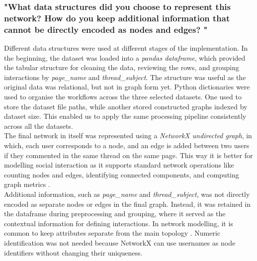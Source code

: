 \documentclass[acmsmall,nonacm,natbib=false]{acmart}
\begin{document}
\subsubsection{\large{\textbf{"What data structures did you choose to represent this network? How do you keep additional information that cannot be directly encoded as nodes and edges? "}}}
\leavevmode \par \noindent
Different data structures were used at different stages of the implementation. In the beginning, the dataset was loaded into a \textit{pandas dataframe}, which provided the tabular structure for cleaning the data, reviewing the rows, and grouping interactions by \textit{page\_name} and \textit{thread\_subject}. The structure was useful as the original data was relational, but not in graph form yet. Python dictionaries were used to organise the workflows across the three selected datasets. One used to store the dataset file paths, while another stored constructed graphs indexed by dataset size. This enabled us to apply the same processing pipeline consistently across all the datasets.\\
The final network in itself was represented using a \textit{NetworkX undirected graph}, in which, each user corresponds to a node, and an edge is added between two users if they commented in the same thread on the same page. This way it is better for modelling social interaction as it supports standard network operations like counting nodes and edges, identifying connected components, and computing graph metrics  \cite{hagberg2008exploring, newman2010networks}.\\
Additional information, such as \textit{page\_name} and \textit{thread\_subject}, was not directly encoded as separate nodes or edges in the final graph. Instead, it was retained in the dataframe during preprocessing and grouping, where it served as the contextual information for defining interactions.
In network modelling, it is common to keep attributes separate from the main topology \cite{newman2010networks}.
Numeric identification was not needed because NetworkX can use usernames as node identifiers without changing their uniqueness.
\end{document}
